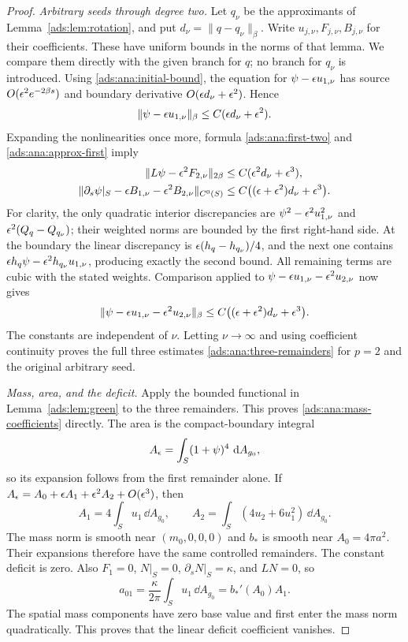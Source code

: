 \begin{proof}
\emph{Arbitrary seeds through degree two.}
Let $q_\nu$ be the approximants of Lemma~\ref{ads:lem:rotation}, and
put $d_\nu=\|q-q_\nu\|_\beta$.  Write $u_{j,\nu},F_{j,\nu},B_{j,\nu}$
for their coefficients.  These have uniform bounds in the norms of
that lemma.  We compare them directly with the given branch for $q$;
no branch for $q_\nu$ is introduced.
Using \eqref{ads:ana:initial-bound}, the equation for
$\psi-\epsilon u_{1,\nu}$ has source
$O(\epsilon^2e^{-2\beta s})$ and boundary derivative
$O(\epsilon d_\nu+\epsilon^2)$.  Hence
\begin{equation}
 \|\psi-\epsilon u_{1,\nu}\|_\beta
       \leq C(\epsilon d_\nu+\epsilon^2).
 \label{ads:ana:approx-first}
\end{equation}
Expanding the nonlinearities once more, formula
\eqref{ads:ana:first-two} and \eqref{ads:ana:approx-first} imply
\begin{align}
 \|L\psi-\epsilon^2F_{2,\nu}\|_{2\beta}
   &\leq C(\epsilon^2d_\nu+\epsilon^3),\notag\\
 \|\partial_s\psi|_S-\epsilon B_{1,\nu}-\epsilon^2B_{2,\nu}\|_{C^0(S)}
   &\leq C\bigl((\epsilon+\epsilon^2)d_\nu+\epsilon^3\bigr).
 \label{ads:ana:approx-sources}
\end{align}
For clarity, the only quadratic interior discrepancies are
$\psi^2-\epsilon^2u_{1,\nu}^2$ and
$\epsilon^2(Q_q-Q_{q_\nu})$; their weighted norms are bounded by the
first right-hand side.  At the boundary the linear discrepancy is
$\epsilon(h_q-h_{q_\nu})/4$, and the next one contains
$\epsilon h_q\psi-\epsilon^2h_{q_\nu}u_{1,\nu}$, producing exactly the
second bound.  All remaining terms are cubic with the stated weights.
Comparison applied to
$\psi-\epsilon u_{1,\nu}-\epsilon^2u_{2,\nu}$ now gives
\[
 \|\psi-\epsilon u_{1,\nu}-\epsilon^2u_{2,\nu}\|_\beta
 \leq C\bigl((\epsilon+\epsilon^2)d_\nu+\epsilon^3\bigr).
\]
The constants are independent of $\nu$.  Letting $\nu\to\infty$
and using coefficient continuity proves the full three estimates
\eqref{ads:ana:three-remainders} for $p=2$ and the original arbitrary seed.

\emph{Mass, area, and the deficit.}
Apply the bounded functional in Lemma~\ref{ads:lem:green} to the three
remainders.  This proves \eqref{ads:ana:mass-coefficients} directly.
The area is the compact-boundary integral
\[
 A_\epsilon=\int_S(1+\psi)^4\,\,\mathrm d A_{g_0},
\]
so its expansion follows from the first remainder alone.  If
$A_\epsilon=A_0+\epsilon A_1+\epsilon^2 A_2+O(\epsilon^3)$, then
\[
 A_1=4\int_Su_1\,\dd A_{g_0},\qquad
 A_2=\int_S(4u_2+6u_1^2)\,\dd A_{g_0}.
\]
The mass norm is smooth near $(m_0,0,0,0)$ and $b_*$ is smooth near
$A_0=4\pi a^2$.  Their expansions therefore have the same controlled
remainders.  The constant deficit is zero.  Also $F_1=0$,
$N|_S=0$, $\partial_sN|_S=\kappa$, and $LN=0$, so
\[
 a_{01}=\frac\kappa{2\pi}\int_Su_1\,\dd A_{g_0}
        =b_*'(A_0)A_1.
\]
The spatial mass components have zero base value and first enter
the mass norm quadratically.  This proves that the linear deficit
coefficient vanishes.


\end{proof}

